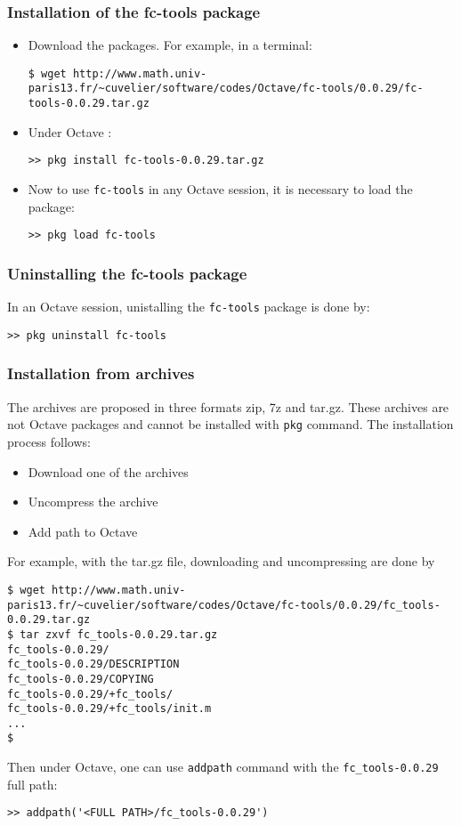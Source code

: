 \subsubsection{Installation of the fc-tools package}

\begin{itemize}
\item Download the packages. For example, in a terminal:
\begin{verbatim}
$ wget http://www.math.univ-paris13.fr/~cuvelier/software/codes/Octave/fc-tools/0.0.29/fc-tools-0.0.29.tar.gz
\end{verbatim}
\item Under Octave :
\begin{verbatim}
>> pkg install fc-tools-0.0.29.tar.gz
\end{verbatim}
\item Now to use \texttt{fc-tools} in any Octave session, it is necessary to load the package:
\begin{verbatim}
>> pkg load fc-tools
\end{verbatim}
\end{itemize}

\subsubsection{Uninstalling the fc-tools package}
In an Octave session, unistalling the \texttt{fc-tools} package is done by:
\begin{verbatim}
>> pkg uninstall fc-tools
\end{verbatim}

\subsubsection{Installation from archives}
The archives are proposed in three formats zip, 7z and tar.gz. These archives are not Octave packages and cannot be installed with \texttt{pkg} command.
The installation process follows:
\begin{itemize}
\item Download one of the archives
\item Uncompress the archive
\item Add path to Octave
\end{itemize}

For example, with the tar.gz file, downloading and uncompressing are done by 
\begin{verbatim}
$ wget http://www.math.univ-paris13.fr/~cuvelier/software/codes/Octave/fc-tools/0.0.29/fc_tools-0.0.29.tar.gz
$ tar zxvf fc_tools-0.0.29.tar.gz
fc_tools-0.0.29/
fc_tools-0.0.29/DESCRIPTION
fc_tools-0.0.29/COPYING
fc_tools-0.0.29/+fc_tools/
fc_tools-0.0.29/+fc_tools/init.m
...
$
\end{verbatim}
Then under Octave, one can use \texttt{addpath} command with the \texttt{fc_tools-0.0.29} full path:
\begin{verbatim}
>> addpath('<FULL PATH>/fc_tools-0.0.29')
\end{verbatim}
 
